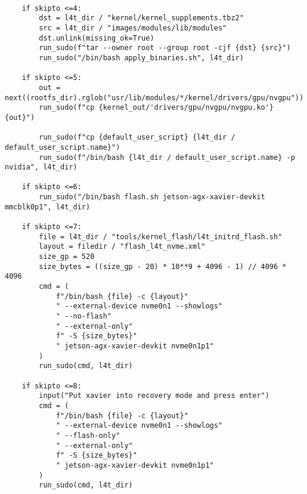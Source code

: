 \begin{verbatim}
    
    if skipto <=4:
        dst = l4t_dir / "kernel/kernel_supplements.tbz2"
        src = l4t_dir / "images/modules/lib/modules"
        dst.unlink(missing_ok=True)
        run_sudo(f"tar --owner root --group root -cjf {dst} {src}")
        run_sudo("/bin/bash apply_binaries.sh", l4t_dir)
        
    if skipto <=5:
        out = next((rootfs_dir).rglob("usr/lib/modules/*/kernel/drivers/gpu/nvgpu"))
        run_sudo(f"cp {kernel_out/'drivers/gpu/nvgpu/nvgpu.ko'} {out}")
        
        run_sudo(f"cp {default_user_script} {l4t_dir / default_user_script.name}")
        run_sudo(f"/bin/bash {l4t_dir / default_user_script.name} -p nvidia", l4t_dir)

    if skipto <=6:
        run_sudo("/bin/bash flash.sh jetson-agx-xavier-devkit mmcblk0p1", l4t_dir)

    if skipto <=7:
        file = l4t_dir / "tools/kernel_flash/l4t_initrd_flash.sh"
        layout = filedir / "flash_l4t_nvme.xml"
        size_gp = 520
        size_bytes = ((size_gp - 20) * 10**9 + 4096 - 1) // 4096 * 4096
        cmd = (
            f"/bin/bash {file} -c {layout}"
            " --external-device nvme0n1 --showlogs"
            " --no-flash"
            " --external-only"
            f" -S {size_bytes}"
            " jetson-agx-xavier-devkit nvme0n1p1"
        )
        run_sudo(cmd, l4t_dir)

    if skipto <=8:
        input("Put xavier into recovery mode and press enter")
        cmd = (
            f"/bin/bash {file} -c {layout}"
            " --external-device nvme0n1 --showlogs"
            " --flash-only"
            " --external-only"
            f" -S {size_bytes}"
            " jetson-agx-xavier-devkit nvme0n1p1"
        )
        run_sudo(cmd, l4t_dir)
\end{verbatim}